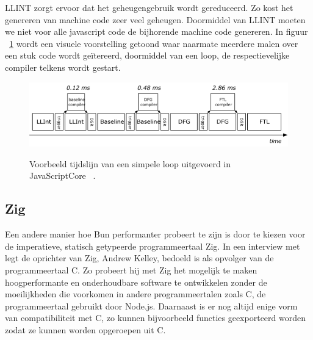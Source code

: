 LLINT zorgt ervoor dat het geheugengebruik wordt gereduceerd. Zo kost het genereren van machine code zeer veel geheugen.
Doormiddel van LLINT moeten we niet voor alle javascript code de bijhorende machine code genereren.
In figuur ~\ref{fig:javascriptcore} wordt een visuele voorstelling getoond 
waar naarmate meerdere malen over een stuk code wordt geïtereerd, doormiddel van een loop, de respectievelijke compiler telkens wordt gestart.
\begin{figure}[H]
    \centering
    \includegraphics[width=.9\textwidth]{graphics/javascriptcore.png}
    \caption{\label{fig:javascriptcore}}Voorbeeld tijdslijn van een simpele loop uitgevoerd in JavaScriptCore ~\autocite{Pizlo2020}.
\end{figure}

\subsection{Zig}
Een andere manier hoe Bun performanter probeert te zijn is door te kiezen voor de imperatieve, statisch getypeerde programmeertaal Zig. 
In een interview met ~\textcite{Motroc2017} legt de oprichter van Zig, Andrew Kelley, bedoeld is als opvolger van de programmeertaal C.
Zo probeert hij met Zig het mogelijk te maken hoogperformante en onderhoudbare software te ontwikkelen 
zonder de moeilijkheden die voorkomen in andere programmeertalen zoals C, de programmeertaal gebruikt door Node.js.
Daarnaast is er nog altijd enige vorm van compatibiliteit met C, 
zo kunnen bijvoorbeeld functies geexporteerd worden zodat ze kunnen worden opgeroepen uit C.

